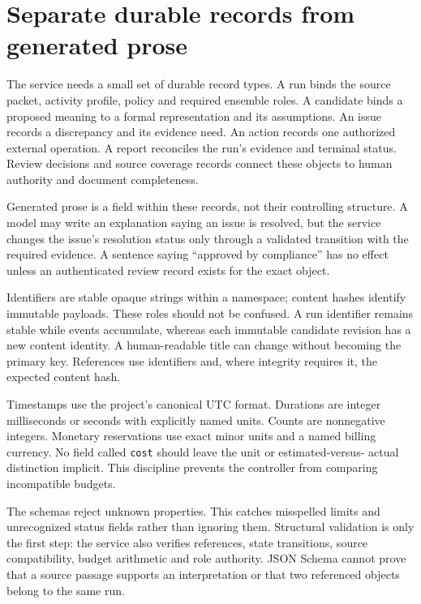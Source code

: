 \documentclass[12pt,a4paper,oneside,openany]{book}
\begin{document}
\section{Separate durable records from generated prose}
\label{merge:M08:01}


The service needs a small set of durable record types. A run binds the source
packet, activity profile, policy and required ensemble roles. A candidate binds a
proposed meaning to a formal representation and its assumptions. An issue records
a discrepancy and its evidence need. An action records one authorized external
operation. A report reconciles the run's evidence and terminal status. Review
decisions and source coverage records connect these objects to human authority
and document completeness.

Generated prose is a field within these records, not their controlling structure.
A model may write an explanation saying an issue is resolved, but the service
changes the issue's resolution status only through a validated transition with
the required evidence. A sentence saying ``approved by compliance'' has no effect
unless an authenticated review record exists for the exact object.

Identifiers are stable opaque strings within a namespace; content hashes identify
immutable payloads. These roles should not be confused. A run identifier remains
stable while events accumulate, whereas each immutable candidate revision has a
new content identity. A human-readable title can change without becoming the
primary key. References use identifiers and, where integrity requires it, the
expected content hash.

Timestamps use the project's canonical UTC format. Durations are integer
milliseconds or seconds with explicitly named units. Counts are nonnegative
integers. Monetary reservations use exact minor units and a named billing
currency. No field called \texttt{cost} should leave the unit or estimated-versus-
actual distinction implicit. This discipline prevents the controller from
comparing incompatible budgets.

The schemas reject unknown properties. This catches misspelled limits and
unrecognized status fields rather than ignoring them. Structural validation is
only the first step: the service also verifies references, state transitions,
source compatibility, budget arithmetic and role authority. JSON Schema cannot
prove that a source passage supports an interpretation or that two referenced
objects belong to the same run.
\end{document}
